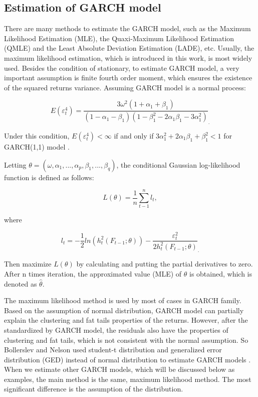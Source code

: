 \subsection{Estimation of GARCH model}

There are many methods to estimate the GARCH model, such as the Maximum Likelihood Estimation (MLE), the Quaxi-Maximum Likelihood Estimation (QMLE) and the Least Absolute Deviation Estimation (LADE), etc. Usually, the maximum likelihood estimation, which is introduced in this work, is most widely used. Besides the condition of stationary, to estimate GARCH model, a very important assumption is finite fourth order moment, which ensures the existence of the squared returns variance. Assuming GARCH model is a normal process:
 
\begin{equation}
E(\varepsilon_t^4)=\frac{3\omega^2(1+\alpha_1+\beta_1)}{(1-\alpha_1-\beta_1)(1-\beta_1^2-2\alpha_1\beta_1-3\alpha_1^2)}_.
\end{equation}

Under this condition, $E(\varepsilon_t^4)<\infty$ if and only if $3\alpha_1^2+2\alpha_1\beta_1+\beta_1^2<1$ for GARCH(1,1) model \citep{Milhj2012}.  

Letting  $\theta=(\omega, \alpha_1, ..., \alpha_p,\beta_1,..., \beta_q)$, the conditional Gaussian log-likelihood function is defined as follows:

\begin{equation}
 L(\theta) = \frac{1}{n}\sum_{t-1}^nl_t,
\end{equation}

where

\begin{equation}
l_t =-\frac{1}{2}ln(h_t^2(F_{t-1};\theta))-\frac{\varepsilon_t^2}{2h_t^2(F_{t-1};\theta)}_.
\end{equation}

Then maximize $L(\theta)$ by calculating and putting the partial derivatives to zero. After n times iteration, the approximated value (MLE) of $\theta$ is obtained, which is denoted as $\hat{\theta}$.

The maximum likelihood method is used by most of cases in GARCH family. Based on the assumption of normal distribution, GARCH model can partially explain the clustering and fat tails properties of the returns. However, after the standardized by GARCH model, the residuals also have the properties of clustering and fat tails, which is not consistent with the normal assumption. So Bollerslev and Nelson used student-t distribution and generalized error distribution (GED) instead of normal distribution to estimate GARCH models \citep{Bollerslev1986,Nelson1991}. When we estimate other GARCH models, which will be discussed below as examples, the main method is the same, maximum likelihood method. The most significant difference is the assumption of the distribution. 

